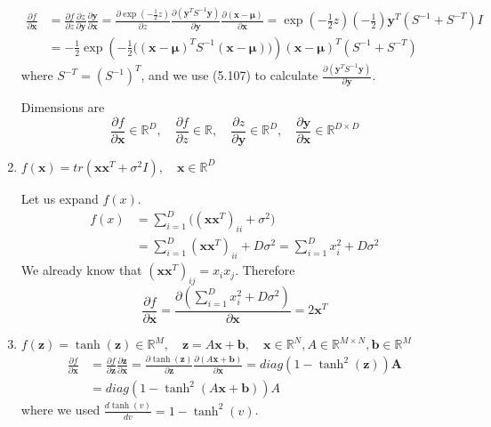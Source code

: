 \begin{enumerate}[label=\alph*.]
\begin{align*}
\frac{\partial f}{\partial \textbf{x}} &= \frac{\partial f}{\partial z} \frac{\partial z}{\partial \textbf{y}}\frac{\partial \textbf{y}}{\partial \textbf{x}} = \frac{\partial \exp(-\frac{1}{2}z)}{\partial z} \frac{\partial (\textbf{y}^TS^{-1}\textbf{y})}{\partial \textbf{y}}\frac{\partial (\textbf{x} - \bm{\mu})}{\partial \textbf{x}} = \exp\left(-\frac{1}{2}z\right)\left(-\frac{1}{2}\right)\textbf{y}^T(S^{-1} + S^{-T})I \\
&=-\frac{1}{2}\exp\left(-\frac{1}{2}\Big((\textbf{x} - \bm{\mu})^TS^{-1}(\textbf{x} - \bm{\mu})\Big)\right)(\textbf{x} - \bm{\mu})^T(S^{-1} + S^{-T})
\end{align*}
where $S^{-T} = \left(S^{-1}\right)^T$, and we use (5.107) to calculate $\frac{\partial (\textbf{y}^TS^{-1}\textbf{y})}{\partial \textbf{y}}$.

Dimensions are 
\[
\frac{\partial f}{\partial \textbf{x}} \in \mathbb{R}^D, \quad \frac{\partial f}{\partial z}\in\mathbb{R}, \quad \frac{\partial z}{\partial \textbf{y}}\in\mathbb{R}^{D}, \quad \frac{\partial \textbf{y}}{\partial \textbf{x}}\in\mathbb{R}^{D\times D}
\]
    
    \item $f(\textbf{x}) = tr(\textbf{x}\textbf{x}^T + \sigma^2I),\quad\textbf{x}\in\mathbb{R}^D$
    
Let us expand $f(x)$.
\begin{align*}
f(x)&= \sum_{i=1}^D \Big( (\textbf{x}\textbf{x}^T)_{ii} + \sigma^2 \Big)\\
    &= \sum_{i=1}^D (\textbf{x}\textbf{x}^T)_{ii} + D\sigma^2 = \sum_{i=1}^D x_i^2 + D\sigma^2
\end{align*} 
We already know that $(\textbf{x}\textbf{x}^T)_{ij} = x_ix_j$. Therefore
\[
\frac{\partial f}{\partial \textbf{x}} = \frac{\partial \left( \sum_{i=1}^D x_i^2 + D\sigma^2 \right)}{\partial \textbf{x}} = 2\textbf{x}^T
\]

    \item $f(\textbf{z}) = \tanh(\textbf{z})\in\mathbb{R}^M,\quad \textbf{z}= A\textbf{x} + \textbf{b}, \quad \textbf{x}\in\mathbb{R}^N, A\in\mathbb{R}^{M\times N}, \textbf{b}\in\mathbb{R}^M$
\begin{align*}
\frac{\partial f}{\partial \textbf{x}} &= \frac{\partial f}{\partial \textbf{z}} \frac{\partial \textbf{z}}{\partial \textbf{x}}= \frac{\partial \tanh(\textbf{z})}{\partial \textbf{z}} \frac{\partial (A\textbf{x} + \textbf{b})}{\partial \textbf{x}} = diag\left(1 - \tanh^2(\textbf{z})\right) \textbf{A}\\
&= diag\left(1 - \tanh^2(A\textbf{x} + \textbf{b})\right) A 
\end{align*}
where we used $\frac{d \tanh(v)}{dv} = 1 - \tanh^2(v)$.


\end{enumerate}
